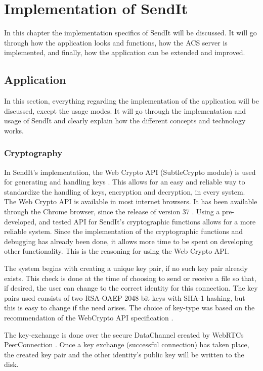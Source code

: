 %
\chapter{Implementation of SendIt} %
%
\label{Chapter4} %
%
In this chapter the implementation specifics of SendIt will be discussed. It will go through how the application looks and functions, how the ACS server is implemented, and finally, how the application can be extended and improved.

\section{Application}
%
  In this section, everything regarding the implementation of the application will be discussed, except the usage modes. It will go through the implementation and usage of SendIt and clearly explain how the different concepts and technology works.
  \subsection{Cryptography}
  \label{sec:crypto_imp}
    In SendIt's implementation, the Web Crypto API (SubtleCrypto module) is used for generating and handling keys \cite{ar_webcrypto}. This allows for an easy and reliable way to standardize the handling of keys, encryption and decryption, in every system. The Web Crypto API is available in most internet browsers. It has been available through the Chrome browser, since the release of version 37 \cite{url_webcr_supp}. Using a pre-developed, and tested API for SendIt's cryptographic functions allows for a more reliable system. Since the implementation of the cryptographic functions and debugging has already been done, it allows more time to be spent on developing other functionality. This is the reasoning for using the Web Crypto API.

    The system begins with creating a unique key pair, if no such key pair already exists. This check is done at the time of choosing to send or receive a file so that, if desired, the user can change to the correct identity for this connection. The key pairs used consists of two RSA-OAEP 2048 bit keys with SHA-1 hashing, but this is easy to change if the need arises. The choice of key-type was based on the recommendation of the WebCrypto API specification \cite{ar_webcrypto}.

    The key-exchange is done over the secure DataChannel created by WebRTCs PeerConnection \cite{ar_webrtc}. Once a key exchange (successful connection) has taken place, the created key pair and the other identity's public key will be written to the disk.

